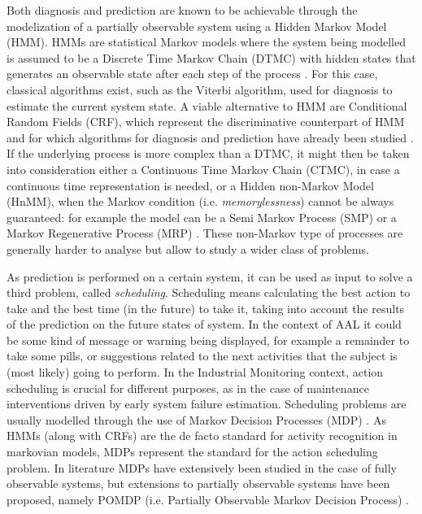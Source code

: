 \documentclass{article}
\begin{document}
        Both diagnosis and prediction are known to be achievable through the modelization of a partially observable system using a Hidden Markov Model (HMM). HMMs are statistical Markov models where the system being modelled is assumed to be a Discrete Time Markov Chain (DTMC) with hidden states that generates an observable state after each step of the process \cite{rabiner1986introduction}. For this case, classical algorithms exist, such as the Viterbi algorithm, used for diagnosis to estimate the current system state. A viable alternative to HMM are Conditional Random Fields (CRF), which represent the discriminative counterpart of HMM and for which algorithms for diagnosis and prediction have already been studied \cite{lafferty2001conditional}. If the underlying process is more complex than a DTMC, it might then be taken into consideration either a Continuous Time Markov Chain (CTMC), in case a continuous time representation is needed, or a Hidden non-Markov Model (HnMM), when the Markov condition (i.e. \textit{memorylessness}) cannot be always guaranteed: for example the model can be a Semi Markov Process (SMP) \cite{lipsky2009semi} or a Markov Regenerative Process (MRP) \cite{logothetis1995markov}. These non-Markov type of processes are generally harder to analyse but allow to study a wider class of problems.
        
        As prediction is performed on a certain system, it can be used as input to solve a third problem, called \textit{scheduling}. Scheduling means calculating the best action to take and the best time (in the future) to take it, taking into account the results of the prediction on the future states of system. In the context of AAL it could be some kind of message or warning being displayed, for example a remainder to take some pills, or suggestions related to the next activities that the subject is (most likely) going to perform. In the Industrial Monitoring context, action scheduling is crucial for different purposes, as in the case of maintenance interventions driven by early system failure estimation. Scheduling problems are usually modelled through the use of Markov Decision Processes (MDP) \cite{puterman2014markov, baier2005efficient}. As HMMs (along with CRFs) are the de facto standard for activity recognition in markovian models, MDPs represent the standard for the action scheduling problem. In literature MDPs have extensively been studied in the case of fully observable systems, but extensions to partially observable systems have been proposed, namely POMDP (i.e. Partially Observable Markov Decision Process) \cite{monahan1982state}.
        
\end{document}
